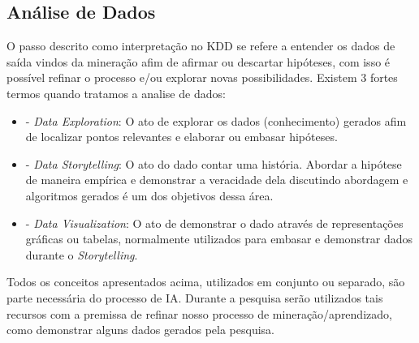 \subsection{Análise de Dados}
O passo descrito como interpretação no KDD se refere a entender os dados de saída vindos da mineração afim de afirmar ou descartar hipóteses, com isso é possível refinar o processo e/ou explorar novas possibilidades. Existem 3 fortes termos quando tratamos a analise de dados:
\begin{itemize}
    \item - \textit{Data Exploration}: O ato de explorar os dados (conhecimento) gerados afim de localizar pontos relevantes e elaborar ou embasar hipóteses.
    \item - \textit{Data Storytelling}: O ato do dado contar uma história. Abordar a hipótese de maneira empírica e demonstrar a veracidade dela discutindo abordagem e algoritmos gerados é um dos objetivos dessa área.
    \item - \textit{Data Visualization}: O ato de demonstrar o dado através de representações gráficas ou tabelas, normalmente utilizados para embasar e demonstrar dados durante o \textit{Storytelling}.
\end{itemize}

Todos os conceitos apresentados acima, utilizados em conjunto ou separado, são parte necessária do processo de IA. Durante a pesquisa serão utilizados tais recursos com a premissa de refinar nosso processo de mineração/aprendizado, como demonstrar alguns dados gerados pela pesquisa.